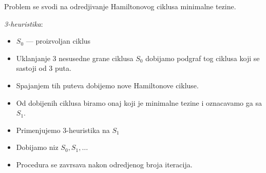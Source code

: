 \documentclass[12p, a4paper]{article}
\begin{document}
\begin{multicols}{2}
    Problem se svodi na odredjivanje Hamiltonovog ciklusa minimalne tezine.

    \emph{3-heuristika}:
    \begin{itemize}
        \itemsep0em
        \item $S_0$ --- proizvoljan ciklus
        \item Uklanjanje 3 nesusedne grane ciklusa $S_0$ dobijamo podgraf tog
            ciklusa koji se sastoji od 3 puta.
        \item Spajanjem tih puteva dobijemo nove Hamiltonove cikluse.
        \item Od dobijenih ciklusa biramo onaj koji je minimalne tezine i 
            oznacavamo ga sa $S_1$.
        \item Primenjujemo 3-heuristika na $S_1$
        \item Dobijamo niz $S_0, S_1, \ldots$
        \item Procedura se zavrsava nakon odredjenog broja iteracija.
    \end{itemize}
    

\end{multicols}
\end{document}
